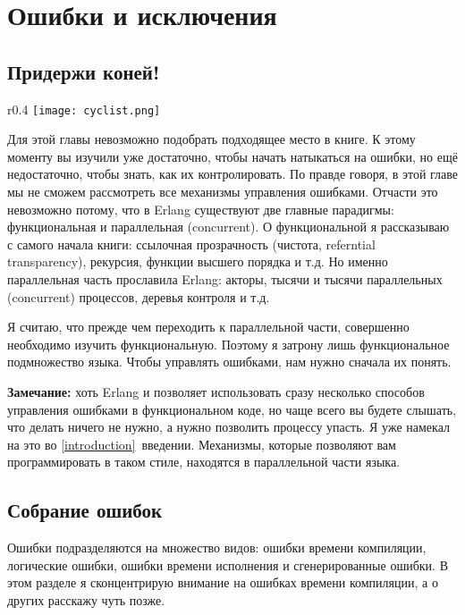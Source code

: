 \chapter{Ошибки и исключения}
\label{errors-and-exceptions}
\section{Придержи коней!}
\label{not-so-fast}
\begin{wrapfigure}{r}{0.4\linewidth}
    \texttt{[image: cyclist.png]}
\end{wrapfigure}
Для этой главы невозможно подобрать подходящее место в книге.
К этому моменту вы изучили уже достаточно, чтобы начать натыкаться на ошибки, но ещё недостаточно, чтобы знать, как их контролировать.
По правде говоря, в этой главе мы не сможем рассмотреть все механизмы управления ошибками.
Отчасти это невозможно потому, что в Erlang существуют две главные парадигмы: функциональная и параллельная (concurrent).
О функциональной я рассказываю с самого начала книги: ссылочная прозрачность (чистота, referntial transparency), рекурсия, функции высшего порядка и т.д.
Но именно параллельная часть прославила Erlang: акторы, тысячи и тысячи параллельных (concurrent) процессов, деревья контроля и т.д.

Я считаю, что прежде чем переходить к параллельной части, совершенно необходимо изучить функциональную.
Поэтому я затрону лишь функциональное подмножество языка.
Чтобы управлять ошибками, нам нужно сначала их понять.\\
\colorbox{lgray}
{
\begin{minipage}{1.0\linewidth}
    \textbf{Замечание:} хоть Erlang и позволяет использовать сразу несколько способов управления ошибками в функциональном коде, но чаще всего вы будете слышать, что делать ничего не нужно, а нужно позволить процессу упасть.
    Я уже намекал на это во \ref{introduction}~введении.
    Механизмы, которые позволяют вам программировать в таком стиле, находятся в параллельной части языка.
\end{minipage}
}
\section{Собрание ошибок}
\label{a-compilation-of-errors}
Ошибки подразделяются на множество видов: ошибки времени компиляции, логические ошибки, ошибки времени исполнения и сгенерированные ошибки.
В этом разделе я сконцентрирую внимание на ошибках времени компиляции, а о других расскажу чуть позже.

